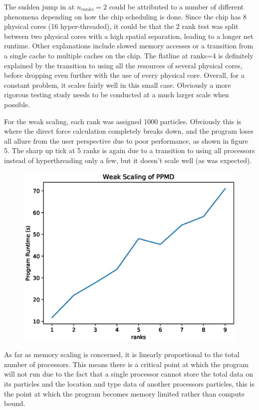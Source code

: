 \documentclass[%
 reprint,
 amsmath,amssymb,
 aps,
pra,
prb,
rmp,
prstab,
prstper,
]{revtex4-1}
\begin{document}
The sudden jump in at $n_{ranks}=2$ could be attributed to a number of different 
phenomena depending on how the chip scheduling is done. Since the chip has 8
physical cores (16 hyper-threaded), it could be that the 2 rank test was split
between two physical cores with a high spatial separation, leading to a longer
net runtime. Other explanations include slowed memory accesses or a transition
from a single cache to multiple caches on the chip. The flatline at ranks=4 is
definitely explained by the transition to using all the resources of several
physical cores, before dropping even further with the use of every physical core.
Overall, for a constant problem, it scales fairly well in this small case. Obviously
a more rigorous testing study needs to be conducted at a much larger scale when
possible.

For the weak scaling, each rank was assigned 1000 particles. Obviously this is where
the direct force calculation completely breaks down, and the program loses all allure
from the user perspective due to poor performance, as shown in figure 5. The sharp up
tick at 5 ranks is again due to a transition to using all processors instead of hyperthreading only a few, but it doesn't scale well (as was expected).


\begin{figure}
	\centering
	\includegraphics[width=8cm\linewidth, height=8cm\textheight]{WeakScaling}
	\caption{}
	\label{fig:weakscaling}
\end{figure}

As far as memory scaling is concerned, it is linearly proportional to the total
number of processors. This means there is a critical point at which the program
will not run due to the fact that a single processor cannot store the total
data on its particles and the location and type data of another processors 
particles, this is the point at which the program becomes memory limited rather
than compute bound. 
\end{document}
